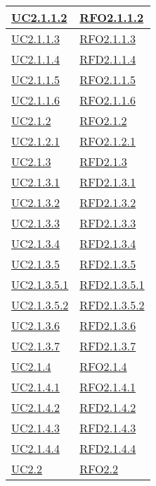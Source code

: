 \begin{longtable}{|>{\centering}m{5cm}|m{5cm}<{\centering}|}
\hyperref[UC2.1.1.2]{UC2.1.1.2} & \hyperlink{RFO2.1.1.2}{RFO2.1.1.2}\\ \hline
\hyperref[UC2.1.1.3]{UC2.1.1.3} & \hyperlink{RFO2.1.1.3}{RFO2.1.1.3}\\ \hline
\hyperref[UC2.1.1.4]{UC2.1.1.4} & \hyperlink{RFD2.1.1.4}{RFD2.1.1.4}\\ \hline
\hyperref[UC2.1.1.5]{UC2.1.1.5} & \hyperlink{RFO2.1.1.5}{RFO2.1.1.5}\\ \hline
\hyperref[UC2.1.1.6]{UC2.1.1.6} & \hyperlink{RFO2.1.1.6}{RFO2.1.1.6}\\ \hline
\hyperref[UC2.1.2]{UC2.1.2} & \hyperlink{RFO2.1.2}{RFO2.1.2}\\ \hline
\hyperref[UC2.1.2.1]{UC2.1.2.1} & \hyperlink{RFO2.1.2.1}{RFO2.1.2.1}\\ \hline
\hyperref[UC2.1.3]{UC2.1.3} & \hyperlink{RFD2.1.3}{RFD2.1.3}\\ \hline
\hyperref[UC2.1.3.1]{UC2.1.3.1} & \hyperlink{RFD2.1.3.1}{RFD2.1.3.1}\\ \hline
\hyperref[UC2.1.3.2]{UC2.1.3.2} & \hyperlink{RFD2.1.3.2}{RFD2.1.3.2}\\ \hline
\hyperref[UC2.1.3.3]{UC2.1.3.3} & \hyperlink{RFD2.1.3.3}{RFD2.1.3.3}\\ \hline
\hyperref[UC2.1.3.4]{UC2.1.3.4} & \hyperlink{RFD2.1.3.4}{RFD2.1.3.4}\\ \hline
\hyperref[UC2.1.3.5]{UC2.1.3.5} & \hyperlink{RFD2.1.3.5}{RFD2.1.3.5}\\ \hline
\hyperref[UC2.1.3.5.1]{UC2.1.3.5.1} & \hyperlink{RFD2.1.3.5.1}{RFD2.1.3.5.1}\\ \hline
\hyperref[UC2.1.3.5.2]{UC2.1.3.5.2} & \hyperlink{RFD2.1.3.5.2}{RFD2.1.3.5.2}\\ \hline
\hyperref[UC2.1.3.6]{UC2.1.3.6} & \hyperlink{RFD2.1.3.6}{RFD2.1.3.6}\\ \hline
\hyperref[UC2.1.3.7]{UC2.1.3.7} & \hyperlink{RFD2.1.3.7}{RFD2.1.3.7}\\ \hline
\hyperref[UC2.1.4]{UC2.1.4} & \hyperlink{RFO2.1.4}{RFO2.1.4}\\ \hline
\hyperref[UC2.1.4.1]{UC2.1.4.1} & \hyperlink{RFO2.1.4.1}{RFO2.1.4.1}\\ \hline
\hyperref[UC2.1.4.2]{UC2.1.4.2} & \hyperlink{RFD2.1.4.2}{RFD2.1.4.2}\\ \hline
\hyperref[UC2.1.4.3]{UC2.1.4.3} & \hyperlink{RFD2.1.4.3}{RFD2.1.4.3}\\ \hline
\hyperref[UC2.1.4.4]{UC2.1.4.4} & \hyperlink{RFD2.1.4.4}{RFD2.1.4.4}\\ \hline
\hyperref[UC2.2]{UC2.2} & \hyperlink{RFO2.2}{RFO2.2}\\ \hline

\end{longtable}
